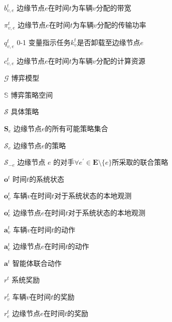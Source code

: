 \begin{denotation}[20mm][15mm]
	\item[$b_{v, e}^{t}$] 边缘节点$e$在时间$t$为车辆$v$分配的带宽
	\item[$\pi_{v, e}^{t}$] 边缘节点$e$在时间$t$为车辆$v$分配的传输功率
	\item[$q_{v, e}^t$] 0-1 变量指示任务$k_v^t$是否卸载至边缘节点$e$
	\item[$c_{v, e}^t$] 边缘节点$e$在时间$t$为车辆$v$分配的计算资源
	\item[$\mathcal{G}$] 博弈模型
	\item[$\mathbb{S}$] 博弈策略空间
	\item[$\mathcal{S}$] 具体策略
	\item[$\mathbf{S}_{e}$] 边缘节点$e$的所有可能策略集合
	\item[$\mathcal{S}_{e}$] 边缘节点$e$的策略
	\item[$\mathcal{S}_{-e}$] 边缘节点 $e$ 的对手$\forall e^{\prime} \in \mathbf{E} \setminus \{e\}$所采取的联合策略
	\item[$\boldsymbol{o}^{t}$] 时间$t$的系统状态
	\item[$\boldsymbol{o}_{v}^{t}$] 车辆$v$在时间$t$对于系统状态的本地观测
	\item[$\boldsymbol{o}_{e}^{t}$] 边缘节点$e$在时间$t$对于系统状态的本地观测
	\item[$\boldsymbol{a}_{v}^{t}$] 车辆$v$在时间$t$的动作
	\item[$\boldsymbol{a}_{e}^{t}$] 边缘节点$e$在时间$t$的动作
	\item[$\boldsymbol{a}^{t}$] 智能体联合动作
	\item[$r^{t}$] 系统奖励
	\item[$r_{v}^{t}$] 车辆$v$在时间$t$的奖励
	\item[$r_{e}^{t}$] 边缘节点$e$在时间$t$的奖励
\end{denotation}

\endinput